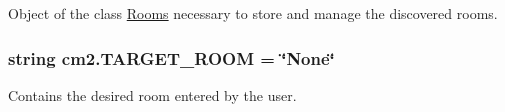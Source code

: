 Object of the class \hyperlink{namespaceRooms}{Rooms} necessary to store and manage the discovered rooms. 

\subsubsection[{\texorpdfstring{T\+A\+R\+G\+E\+T\+\_\+\+R\+O\+OM}{TARGET_ROOM}}]{\setlength{\rightskip}{0pt plus 5cm}string cm2.\+T\+A\+R\+G\+E\+T\+\_\+\+R\+O\+OM = \char`\"{}None\char`\"{}}\hypertarget{namespacecm2_aa4c9405b40d178ce2b7f2f4e3a5eb359}{}\label{namespacecm2_aa4c9405b40d178ce2b7f2f4e3a5eb359}


Contains the desired room entered by the user. 

